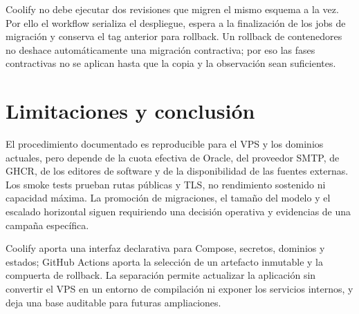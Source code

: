 Coolify no debe ejecutar dos revisiones que migren el mismo esquema a la vez. Por ello el workflow serializa el despliegue, espera a la finalización de los jobs de migración y conserva el tag anterior para rollback. Un rollback de contenedores no deshace automáticamente una migración contractiva; por eso las fases contractivas no se aplican hasta que la copia y la observación sean suficientes.

\section{Limitaciones y conclusión}

El procedimiento documentado es reproducible para el VPS y los dominios actuales, pero depende de la cuota efectiva de Oracle, del proveedor SMTP, de GHCR, de los editores de software y de la disponibilidad de las fuentes externas. Los smoke tests prueban rutas públicas y TLS, no rendimiento sostenido ni capacidad máxima. La promoción de migraciones, el tamaño del modelo y el escalado horizontal siguen requiriendo una decisión operativa y evidencias de una campaña específica.

Coolify aporta una interfaz declarativa para Compose, secretos, dominios y estados; GitHub Actions aporta la selección de un artefacto inmutable y la compuerta de rollback. La separación permite actualizar la aplicación sin convertir el VPS en un entorno de compilación ni exponer los servicios internos, y deja una base auditable para futuras ampliaciones.
